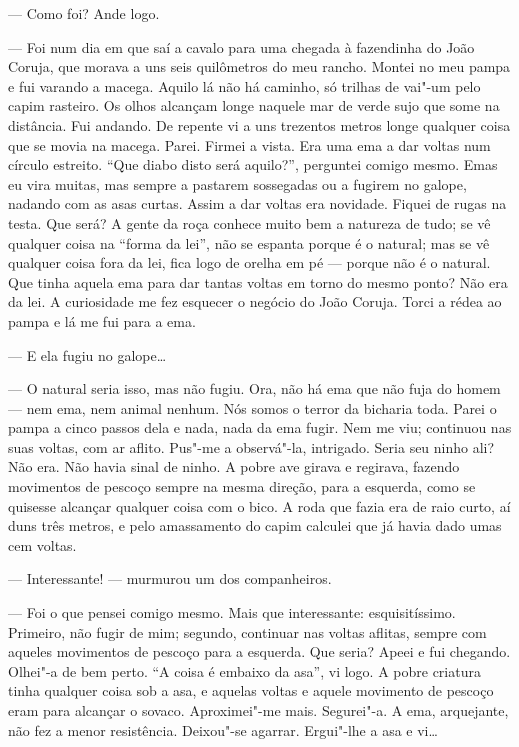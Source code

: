 --- Como foi? Ande logo.

--- Foi num dia em que saí a cavalo para uma chegada à fazendinha do
João Coruja, que morava a uns seis quilômetros do meu rancho. Montei no
meu pampa e fui varando a macega. Aquilo lá não há caminho, só trilhas
de vai"-um pelo capim rasteiro. Os olhos alcançam longe naquele mar de
verde sujo que some na distância. Fui andando. De repente vi a uns
trezentos metros longe qualquer coisa que se movia na macega. Parei.
Firmei a vista. Era uma ema a dar voltas num círculo estreito. ``Que
diabo disto será aquilo?'', perguntei comigo mesmo. Emas eu vira muitas,
mas sempre a pastarem sossegadas ou a fugirem no galope, nadando com as
asas curtas. Assim a dar voltas era novidade. Fiquei de rugas na testa.
Que será? A gente da roça conhece muito bem a natureza de tudo; se vê
qualquer coisa na ``forma da lei'', não se espanta porque é o natural;
mas se vê qualquer coisa fora da lei, fica logo de orelha em pé ---
porque não é o natural. Que tinha aquela ema para dar tantas voltas em
torno do mesmo ponto? Não era da lei. A curiosidade me fez esquecer o
negócio do João Coruja. Torci a rédea ao pampa e lá me fui para a ema.

--- E ela fugiu no galope\ldots{}

--- O natural seria isso, mas não fugiu. Ora, não há ema que não fuja do
homem --- nem ema, nem animal nenhum. Nós somos o terror da bicharia
toda. Parei o pampa a cinco passos dela e nada, nada da ema fugir. Nem
me viu; continuou nas suas voltas, com ar aflito. Pus"-me a observá"-la,
intrigado. Seria seu ninho ali? Não era. Não havia sinal de ninho. A
pobre ave girava e regirava, fazendo movimentos de pescoço sempre na
mesma direção, para a esquerda, como se quisesse alcançar qualquer coisa
com o bico. A roda que fazia era de raio curto, aí duns três metros, e
pelo amassamento do capim calculei que já havia dado umas cem voltas.

--- Interessante! --- murmurou um dos companheiros.

--- Foi o que pensei comigo mesmo. Mais que interessante:
esquisitíssimo. Primeiro, não fugir de mim; segundo, continuar nas
voltas aflitas, sempre com aqueles movimentos de pescoço para a
esquerda. Que seria? Apeei e fui chegando. Olhei"-a de bem perto. ``A
coisa é embaixo da asa'', vi logo. A pobre criatura tinha qualquer coisa
sob a asa, e aquelas voltas e aquele movimento de pescoço eram para
alcançar o sovaco. Aproximei"-me mais. Segurei"-a. A ema, arquejante, não
fez a menor resistência. Deixou"-se agarrar. Ergui"-lhe a asa e vi\ldots{}

